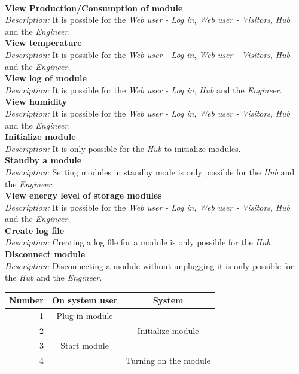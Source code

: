 		\\\textbf{View Production/Consumption of module}
		\\\textit{Description: }
		It is possible for the \textit{Web user - Log in}, \textit{Web user - Visitors}, \textit{Hub} and the \textit{Engineer}.
		\\\textbf{View temperature}
		\\\textit{Description: }
		It is possible for the \textit{Web user - Log in}, \textit{Web user - Visitors}, \textit{Hub} and the \textit{Engineer}.
		\\\textbf{View log of module}
		\\\textit{Description: }
		It is possible for the \textit{Web user - Log in}, \textit{Hub} and the \textit{Engineer}.
		\\\textbf{View humidity}
		\\\textit{Description: }
		It is possible for the \textit{Web user - Log in}, \textit{Web user - Visitors}, \textit{Hub} and the \textit{Engineer}.
		\\\textbf{Initialize module}
		\\\textit{Description: }
		It is only possible for the \textit{Hub} to initialize modules.
		\\\textbf{Standby a module}
		\\\textit{Description: }
		Setting modules in standby mode is only possible for the \textit{Hub} and the \textit{Engineer}.
		\\\textbf{View energy level of storage modules}
		\\\textit{Description: }
		It is possible for the \textit{Web user - Log in}, \textit{Web user - Visitors}, \textit{Hub} and the \textit{Engineer}.
		\\\textbf{Create log file}
		\\\textit{Description: }
		Creating a log file for a module is only possible for the \textit{Hub}.
		\\\textbf{Disconnect module}
		\\\textit{Description: }
		Disconnecting a module without unplugging it is only possible for the \textit{Hub} and the \textit{Engineer}.
		\\\begin{table}[h!]
					\begin{tabular}{| r | c | c |}
					\hline
					Number	& On system user	& System \\ \hline
					1		& Plug in module	& ~ \\ \hline
					2		& ~					& Initialize module \\ \hline
					3		& Start module		& ~ \\ \hline
					4		& ~					& Turning on the module \\ \hline
					\end{tabular}
				\end{table}
